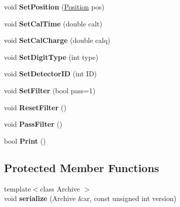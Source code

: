 \begin{DoxyCompactItemize}
\item 
\hypertarget{classRecoDigit_a39a5aee7c3779a79cb6e265b8ff9b17f}{
void {\bfseries SetPosition} (\hyperlink{classPosition}{Position} pos)}
\label{classRecoDigit_a39a5aee7c3779a79cb6e265b8ff9b17f}

\item 
\hypertarget{classRecoDigit_a90c087145b6e2c98604984e77e516097}{
void {\bfseries SetCalTime} (double calt)}
\label{classRecoDigit_a90c087145b6e2c98604984e77e516097}

\item 
\hypertarget{classRecoDigit_a4d99c1fe4f0c12009fe03d2001fbc34a}{
void {\bfseries SetCalCharge} (double calq)}
\label{classRecoDigit_a4d99c1fe4f0c12009fe03d2001fbc34a}

\item 
\hypertarget{classRecoDigit_ae3d6e5e550ee6dc600c5c4fb3d2cc9b8}{
void {\bfseries SetDigitType} (int type)}
\label{classRecoDigit_ae3d6e5e550ee6dc600c5c4fb3d2cc9b8}

\item 
\hypertarget{classRecoDigit_a0b9aff43d262a25049d48e24128ba134}{
void {\bfseries SetDetectorID} (int ID)}
\label{classRecoDigit_a0b9aff43d262a25049d48e24128ba134}

\item 
\hypertarget{classRecoDigit_af041c9a65186701246312d4f619fb0d7}{
void {\bfseries SetFilter} (bool pass=1)}
\label{classRecoDigit_af041c9a65186701246312d4f619fb0d7}

\item 
\hypertarget{classRecoDigit_a5485213b310d7ad62868ac7b63b36164}{
void {\bfseries ResetFilter} ()}
\label{classRecoDigit_a5485213b310d7ad62868ac7b63b36164}

\item 
\hypertarget{classRecoDigit_a1ef3383052ca57bde6f998a31cf597a4}{
void {\bfseries PassFilter} ()}
\label{classRecoDigit_a1ef3383052ca57bde6f998a31cf597a4}

\item 
\hypertarget{classRecoDigit_a85dc77b6895110b7fe560ec368edc95b}{
bool {\bfseries Print} ()}
\label{classRecoDigit_a85dc77b6895110b7fe560ec368edc95b}

\end{DoxyCompactItemize}
\subsection*{Protected Member Functions}
\begin{DoxyCompactItemize}
\item 
\hypertarget{classRecoDigit_af26a99673aa4b79f571e7824bead50e8}{
{\footnotesize template$<$class Archive $>$ }\\void {\bfseries serialize} (Archive \&ar, const unsigned int version)}
\label{classRecoDigit_af26a99673aa4b79f571e7824bead50e8}

\end{DoxyCompactItemize}
